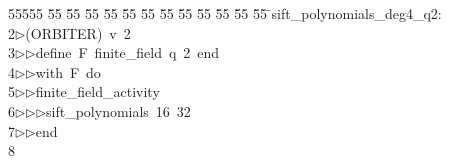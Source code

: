 %
%
\begin{tabbing}
55555 \= 55 \= 55 \= 55 \= 55 \= 55 \= 55 \= 55 \= 55 \= 55 \= 55 \= 55 \= 55 \= \>sift\_polynomials\_deg4\_q2:\\[0pt]
2\>$\triangleright$\>(ORBITER)\ v\ 2\ \\[0pt]
3\>$\triangleright$\>$\triangleright$\>define\ F\ finite\_field\ q\ 2\ end\ \\[0pt]
4\>$\triangleright$\>$\triangleright$\>with\ F\ do\ \\[0pt]
5\>$\triangleright$\>$\triangleright$\>finite\_field\_activity\ \\[0pt]
6\>$\triangleright$\>$\triangleright$\>$\triangleright$\>sift\_polynomials\ 16\ 32\ \\[0pt]
7\>$\triangleright$\>$\triangleright$\>end\\[0pt]
8\>\end{tabbing}
